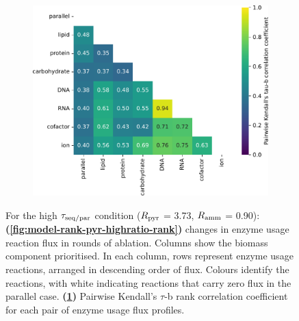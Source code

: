 \begin{figure}
\begin{subfigure}[t]{0.45\textwidth}
    \includegraphics[width=\linewidth]{CompareEnzUse_glc00p00_pyr03p73_amm00p90_2.pdf}
    \caption{
    }
    \label{fig:model-rank-pyr-highratio-kendall}
  \end{subfigure}


  \caption[
    Changes in enzyme usage reaction flux and Kendall's $\tau$-b rank correlation coefficient for each pair, $\exchrate{pyr}$ = \SI{3.73}{\mmolgdwh}, $\exchrate{amm}$ = \SI{0.90}{\mmolgdwh}.
  ]{
    For the high $\tau_{\mathrm{seq}/\mathrm{par}}$ condition ($\exchrate{pyr}$ = \SI{3.73}{\mmolgdwh}, $\exchrate{amm}$ = \SI{0.90}{\mmolgdwh}):
    \textbf{(\ref{fig:model-rank-pyr-highratio-rank})}
    changes in enzyme usage reaction flux in rounds of ablation.
    Columns show the biomass component prioritised.
    In each column, rows represent enzyme usage reactions, arranged in descending order of flux.
    Colours identify the reactions, with white indicating reactions that carry zero flux in the parallel case.
    \textbf{(\ref{fig:model-rank-pyr-highratio-kendall})}
    Pairwise Kendall's $\tau$-b rank correlation coefficient \parencite{kendallTREATMENTTIESRANKING1945} for each pair of enzyme usage flux profiles.
  }
  \label{fig:model-rank-pyr-highratio}
\end{figure}


